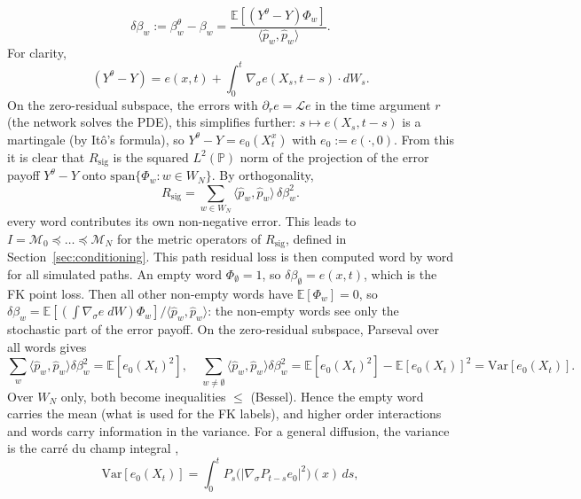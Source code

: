 \documentclass[english]{article}
\begin{document}
\begin{equation}\label{eq:dbeta}
    \delta\beta_w := \beta^\theta_w - \beta_w = \frac{\mathbb E [(Y^\theta - Y)\Phi_w]}{\langle \hat p_w, \hat p_w\rangle}.
\end{equation}
For clarity,
\begin{equation}\label{eq:ydiff}
    (Y^\theta - Y) = e(x,t) + \int^t_0 \nabla_\sigma e(X_s, t-s)\cdot dW_s.
\end{equation}
On the zero-residual subspace, the errors with $\partial_r e = \mathcal L e$ in the time argument $r$ (the network solves the PDE), this simplifies further: $s\mapsto e(X_s,t-s)$ is a martingale (by It\^o's formula), so $Y^\theta - Y = e_0(X^x_t)$ with $e_0 := e(\cdot,0)$. From this it is clear that $R_\mathrm{sig}$ is the squared $L^2(\mathbb P)$ norm of the projection of the error payoff $Y^\theta - Y$ onto $\mathrm{span}\{\Phi_w : w\in W_N\}$. By orthogonality,
\begin{equation}\label{eq:rsig-parseval}
  R_\mathrm{sig} = \sum_{w\in W_N}\langle\hat p_w,\hat p_w\rangle\,\delta\beta_w^2 .
\end{equation}
every word contributes its own non-negative error. This leads to $I = \mathcal M_0\preceq \dots\preceq\mathcal{M}_N$ for the metric operators of $R_\mathrm{sig}$, defined in Section~\ref{sec:conditioning}. This path residual loss is then computed word by word for all simulated paths. An empty word $\Phi_\emptyset = 1$, so $\delta \beta_\emptyset = e(x,t)$, which is the FK point loss. Then all other non-empty words have $\mathbb E [\Phi_w] = 0$, so $\delta\beta_w = \mathbb E[(\int \nabla_\sigma e\; dW)\Phi_w]/\langle \hat p_w, \hat p_w\rangle$: the non-empty words see only the stochastic part of the error payoff. On the zero-residual subspace, Parseval over all words gives
\begin{equation}\label{eq:parseval}
    \sum_w \langle \hat p_w, \hat p_w\rangle \delta \beta_w^2 = \mathbb E[e_0(X_t)^2], \quad \sum_{w \neq \emptyset} \langle \hat p_w, \hat p_w\rangle \delta \beta_w^2 = \mathbb E[e_0(X_t)^2] - \mathbb{E}[e_0(X_t)]^2 = \mathrm{Var}[e_0(X_t)].
\end{equation}
Over $W_N$ only, both become inequalities $\le$ (Bessel). Hence the empty word carries the mean (what is used for the FK labels), and higher order interactions and words carry information in the variance. For a general diffusion, the variance is the carr\'e du champ integral
\cite{bakry2014analysis},
\begin{equation}\label{eq:cdc}
  \mathrm{Var}[e_0(X_t)] = \int_0^t P_s\big(|\nabla_\sigma P_{t-s}e_0|^2\big)(x)\,ds ,
\end{equation}
\end{document}

